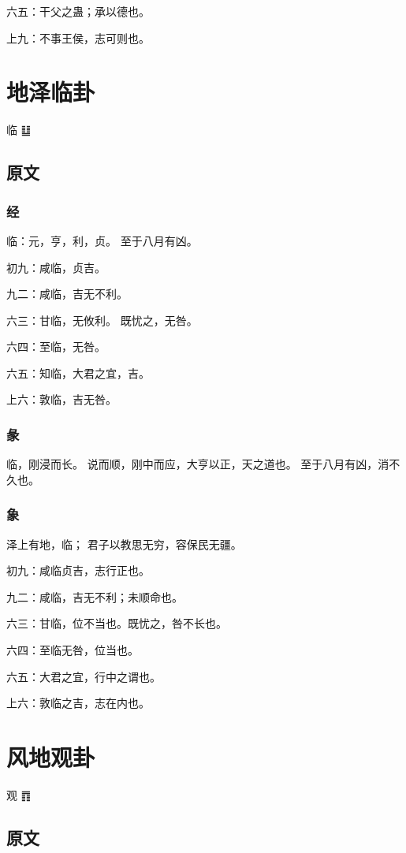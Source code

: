 \documentclass[12pt,oneside]{book}
\begin{document}
六五：干父之蛊；承以德也。

上九：不事王侯，志可则也。

\chapter{地泽临卦}
临 {\Large ䷒}

\section{原文}

\subsection{经}
临：元，亨，利，贞。 至于八月有凶。

初九：咸临，贞吉。

九二：咸临，吉无不利。

六三：甘临，无攸利。 既忧之，无咎。

六四：至临，无咎。

六五：知临，大君之宜，吉。

上六：敦临，吉无咎。

\subsection{彖}
临，刚浸而长。 说而顺，刚中而应，大亨以正，天之道也。 至于八月有凶，消不久也。

\subsection{象}
泽上有地，临； 君子以教思无穷，容保民无疆。

初九：咸临贞吉，志行正也。

九二：咸临，吉无不利；未顺命也。

六三：甘临，位不当也。既忧之，咎不长也。

六四：至临无咎，位当也。

六五：大君之宜，行中之谓也。

上六：敦临之吉，志在内也。


\chapter{风地观卦}
观 {\Large ䷓}

\section{原文}
\end{document}
